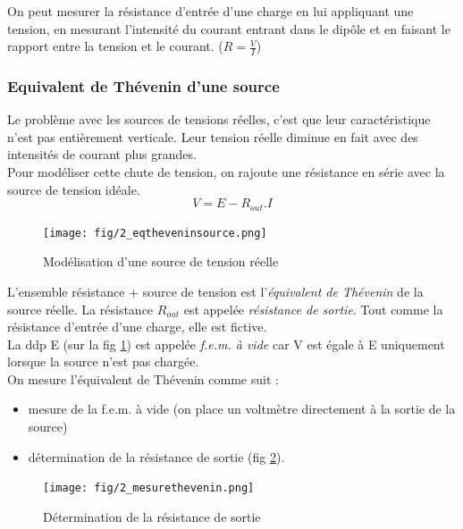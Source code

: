 \documentclass[a4paper]{article}
\begin{document}
    On peut mesurer la résistance d'entrée d'une charge en lui appliquant une tension,
    en mesurant l'intensité du courant entrant dans le dipôle et en faisant
    le rapport entre la tension et le courant. ($R = \frac{V}{I} $)

    \subsubsection{Equivalent de Thévenin d'une source}
    Le problème avec les sources de tensions réelles, c'est que leur caractéristique
    n'est pas entièrement verticale. Leur tension réelle diminue en fait avec
    des intensités de courant plus grandes.\\

    Pour modéliser cette chute de tension, on rajoute une résistance en série
    avec la source de tension idéale. $$V = E - R_{out}.I$$
    \begin{figure}[H]
        \begin{center}
            \texttt{[image: fig/2\_eqtheveninsource.png]}
            \caption{Modélisation d'une source de tension réelle}
            \label{fig:2.2.2:eqtheveninsource}
        \end{center}
    \end{figure}

    L'ensemble résistance + source de tension est l'\textit{équivalent de Thévenin}
    de la source réelle. La résistance $R_{out}$ est appelée \textit{résistance
    de sortie}. Tout comme la résistance d'entrée d'une charge, elle est fictive.\\

    La ddp E (sur la fig \ref{fig:2.2.2:eqtheveninsource}) est appelée \textit{
    f.e.m. à vide} car V est égale à E uniquement lorsque la source n'est pas chargée.\\

    On mesure l'équivalent de Thévenin comme suit :
    \begin{itemize}
        \item mesure de la f.e.m. à vide (on place un voltmètre directement à la sortie de la source)
        \item détermination de la résistance de sortie (fig \ref{fig:2.2.2:mesurethevenin}).
    \end{itemize}

    \begin{figure}[H]
        \begin{center}
            \texttt{[image: fig/2\_mesurethevenin.png]}
            \caption{Détermination de la résistance de sortie}
            \label{fig:2.2.2:mesurethevenin}
        \end{center}
    \end{figure}
\end{document}
